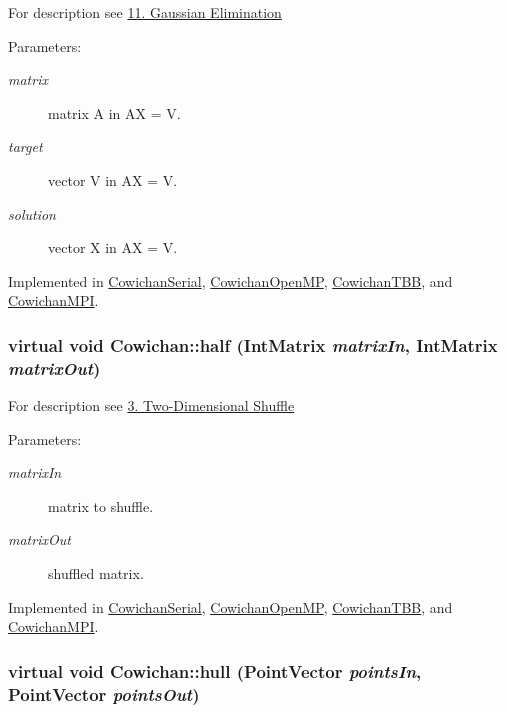 For description see \hyperlink{index_gauss_sec}{11. Gaussian Elimination} \begin{Desc}
\item[Parameters:]
\begin{description}
\item[{\em matrix}]matrix A in AX = V. \item[{\em target}]vector V in AX = V. \item[{\em solution}]vector X in AX = V. \end{description}
\end{Desc}


Implemented in \hyperlink{class_cowichan_serial_b196d2384c2fe8b185e6269a050399eb}{CowichanSerial}, \hyperlink{class_cowichan_open_m_p_363bcd6f0c7b4d0fced94fe4cd59a267}{CowichanOpenMP}, \hyperlink{class_cowichan_t_b_b_d51868e0e65482f7c9e69d73b3904822}{CowichanTBB}, and \hyperlink{class_cowichan_m_p_i_975f8da6c166fe1db3cf9341eeaab000}{CowichanMPI}.\hypertarget{class_cowichan_308603053675bccbe631f04af921f57c}{
\subsubsection[{half}]{\setlength{\rightskip}{0pt plus 5cm}virtual void Cowichan::half ({\bf IntMatrix} {\em matrixIn}, \/  {\bf IntMatrix} {\em matrixOut})}}
\label{class_cowichan_308603053675bccbe631f04af921f57c}


For description see \hyperlink{index_half_sec}{3. Two-Dimensional Shuffle} \begin{Desc}
\item[Parameters:]
\begin{description}
\item[{\em matrixIn}]matrix to shuffle. \item[{\em matrixOut}]shuffled matrix. \end{description}
\end{Desc}


Implemented in \hyperlink{class_cowichan_serial_c08a6b3e23ce26959bac12af077f924f}{CowichanSerial}, \hyperlink{class_cowichan_open_m_p_70989ffe182aebf590e39c56e146b0fb}{CowichanOpenMP}, \hyperlink{class_cowichan_t_b_b_bbf17e641657d54fc0c571c008ac8f7a}{CowichanTBB}, and \hyperlink{class_cowichan_m_p_i_154bbd1a400ee4571f761bff1cdf67cd}{CowichanMPI}.\hypertarget{class_cowichan_0c6b68ae3c059b66893405f8530a2e0a}{
\subsubsection[{hull}]{\setlength{\rightskip}{0pt plus 5cm}virtual void Cowichan::hull ({\bf PointVector} {\em pointsIn}, \/  {\bf PointVector} {\em pointsOut})}}
\label{class_cowichan_0c6b68ae3c059b66893405f8530a2e0a}


